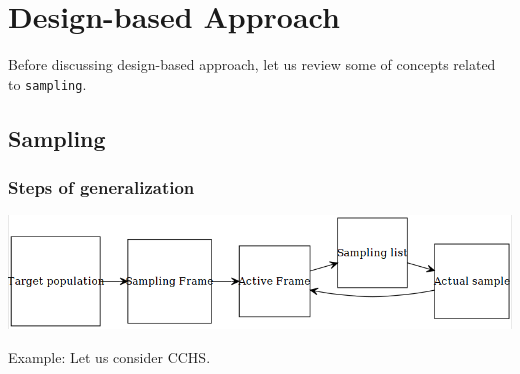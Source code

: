 \documentclass[
]{book}
\begin{document}
\hypertarget{design-based-approach}{%
\chapter{Design-based Approach}\label{design-based-approach}}

Before discussing design-based approach, let us review some of concepts related to \texttt{sampling}.

\hypertarget{sampling}{%
\section{Sampling}\label{sampling}}

\hypertarget{steps-of-generalization}{%
\subsection{Steps of generalization}\label{steps-of-generalization}}

\includegraphics[width=0.65\linewidth]{images/sampling0}

Example: Let us consider CCHS.
\end{document}
